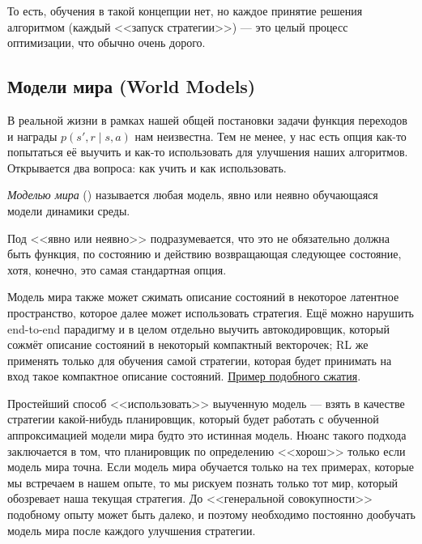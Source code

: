То есть, обучения в такой концепции нет, но каждое принятие решения алгоритмом (каждый <<запуск стратегии>>) --- это целый процесс оптимизации, что обычно очень дорого.

\subsection{Модели мира (World Models)}

В реальной жизни в рамках нашей общей постановки задачи функция переходов и награды $p(s', r \mid s, a)$ нам неизвестна. Тем не менее, у нас есть опция как-то попытаться её выучить и как-то использовать для улучшения наших алгоритмов. Открывается два вопроса: как учить и как использовать.

\begin{definition}
\emph{Моделью мира} () называется любая модель, явно или неявно обучающаяся модели динамики среды.
\end{definition}

Под <<явно или неявно>> подразумевается, что это не обязательно должна быть функция, по состоянию и действию возвращающая следующее состояние, хотя, конечно, это самая стандартная опция.

\begin{remark}
Модель мира также может сжимать описание состояний в некоторое латентное пространство, которое далее может использовать стратегия. Ещё можно нарушить end-to-end парадигму и в целом отдельно выучить автокодировщик, который сожмёт описание состояний в некоторый компактный векторочек; RL же применять только для обучения самой стратегии, которая будет принимать на вход такое компактное описание состояний. \href{https://worldmodels.github.io/assets/mp4/carracing_vae_compare.mp4}{Пример подобного сжатия}.
\end{remark}

Простейший способ <<использовать>> выученную модель --- взять в качестве стратегии какой-нибудь планировщик, который будет работать с обученной аппроксимацией модели мира будто это истинная модель. Нюанс такого подхода заключается в том, что планировщик по определению <<хорош>> только если модель мира точна. Если модель мира обучается только на тех примерах, которые мы встречаем в нашем опыте, то мы рискуем познать только тот мир, который обозревает наша текущая стратегия. До <<генеральной совокупности>> подобному опыту может быть далеко, и поэтому необходимо постоянно дообучать модель мира после каждого улучшения стратегии.


